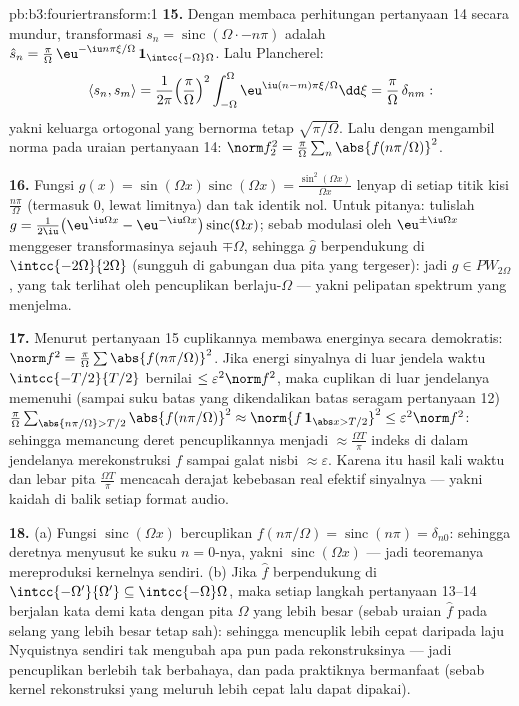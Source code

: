 \begin{solution}{pb:b3:fouriertransform:1}
\textbf{15.} Dengan membaca perhitungan pertanyaan 14 secara mundur,
transformasi $s_n = \operatorname{sinc}(\Omega\cdot -
n\pi)$ adalah $\hat s_n = \frac\pi\Omega\,\eu^{-\iu
n\pi\xi/\Omega}\,\mathbf 1_{\intcc{-\Omega}\Omega}$.
Lalu Plancherel:
\[
\langle s_n, s_m\rangle = \frac1{2\pi}
\Bigl(\frac\pi\Omega\Bigr)^2\int_{-\Omega}^\Omega
\eu^{\iu(n-m)\pi\xi/\Omega}\dd\xi =
\frac\pi\Omega\,\delta_{nm} :
\]
yakni keluarga ortogonal yang bernorma tetap
$\sqrt{\pi/\Omega}$. Lalu dengan mengambil norma pada uraian
pertanyaan 14: $\norm f_2^2 =
\frac\pi\Omega\sum_n\abs{f(n\pi/\Omega)}^2$.

\textbf{16.} Fungsi $g(x) = \sin(\Omega x)\operatorname{sinc}
(\Omega x) = \frac{\sin^2(\Omega x)}{\Omega x}$ lenyap di
setiap titik kisi $\frac{n\pi}\Omega$ (termasuk $0$, lewat
limitnya) dan tak identik nol. Untuk pitanya: tulislah $g =
\frac1{2\iu}\bigl(\eu^{\iu\Omega x} - \eu^{-\iu\Omega
x}\bigr)\operatorname{sinc}(\Omega x)$; sebab modulasi oleh
$\eu^{\pm\iu\Omega x}$ menggeser transformasinya sejauh
$\mp\Omega$, sehingga $\hat g$ berpendukung di
$\intcc{-2\Omega}{2\Omega}$ (sungguh di gabungan dua
pita yang tergeser): jadi $g \in PW_{2\Omega}$, yang tak terlihat oleh
pencuplikan berlaju-$\Omega$ --- yakni pelipatan spektrum yang menjelma.

\textbf{17.} Menurut pertanyaan 15 cuplikannya membawa energinya
secara demokratis: $\norm f^2 = \frac\pi\Omega\sum
\abs{f(n\pi/\Omega)}^2$. Jika energi sinyalnya di luar
jendela waktu $\intcc{-T/2}{T/2}$ bernilai $\leq \varepsilon^2\norm
f^2$, maka cuplikan di luar jendelanya memenuhi (sampai suku
batas yang dikendalikan batas seragam pertanyaan 12)
$\frac\pi\Omega\sum_{\abs{n\pi/\Omega} > T/2}
\abs{f(n\pi/\Omega)}^2 \approx \norm{f\,\mathbf 1_{\abs x >
T/2}}^2 \leq \varepsilon^2\norm f^2$: sehingga memancung
deret pencuplikannya menjadi $\approx \frac{\Omega T}\pi$
indeks di dalam jendelanya merekonstruksi $f$ sampai galat nisbi
$\approx\varepsilon$. Karena itu hasil kali waktu dan lebar pita
$\frac{\Omega T}{\pi}$ mencacah derajat kebebasan real
efektif sinyalnya --- yakni kaidah di balik setiap
format audio.

\textbf{18.} (a) Fungsi $\operatorname{sinc}(\Omega x)$ bercuplikan
$f(n\pi/\Omega) = \operatorname{sinc}(n\pi) =
\delta_{n0}$: sehingga deretnya menyusut ke suku $n = 0$-nya, yakni
$\operatorname{sinc}(\Omega x)$ --- jadi teoremanya mereproduksi
kernelnya sendiri. (b) Jika $\hat f$ berpendukung di
$\intcc{-\Omega'}{\Omega'} \subseteq
\intcc{-\Omega}\Omega$, maka setiap langkah pertanyaan 13--14 berjalan
kata demi kata dengan pita $\Omega$ yang lebih besar (sebab uraian
$\hat f$ pada selang yang lebih besar tetap sah):
sehingga mencuplik lebih cepat daripada laju Nyquistnya sendiri tak mengubah apa pun
pada rekonstruksinya --- jadi pencuplikan berlebih tak berbahaya, dan pada
praktiknya bermanfaat (sebab kernel rekonstruksi yang meluruh lebih cepat
lalu dapat dipakai).


\end{solution}
